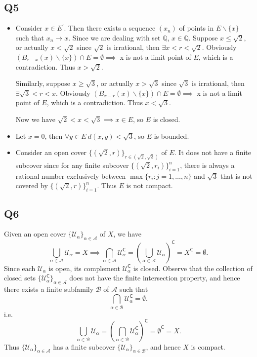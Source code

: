\documentclass[12pt,lettersize]{article}
\newcommand{\Q}{\mathbb{Q}}
\newcommand{\com}{\mathsf{C}}
\newcommand{\U}{\mathcal{U}}
\newcommand{\A}{\mathcal{A}}
\newcommand{\B}{\mathcal{B}}
\begin{document}
	\subsection*{Q5}
	\begin{itemize}
		\item Consider $x\in E^\prime$. Then there exists a sequence $(x_n)$ of points in $E\backslash\{x\}$ such that $x_n\rightarrow x$. Since we are dealing with set $\Q$, $x\in\Q$. Suppose $x\leq\sqrt{2}$, or actually $x<\sqrt{2}$ since $\sqrt{2}$ is irrational, then $\exists x<r<\sqrt{2}$. Obviously $(B_{r-x}(x)\backslash\{x\})\cap E=\emptyset\implies$ x is not a limit point of $E$, which is a contradiction. Thus $x>\sqrt{2}$.
		
		Similarly, suppose $x\geq\sqrt{3}$, or actually $x>\sqrt{3}$ since $\sqrt{3}$ is irrational, then $\exists\sqrt{3}<r<x$. Obviously $(B_{x-r}(x)\backslash\{x\})\cap E=\emptyset\implies$ x is not a limit point of $E$, which is a contradiction. Thus $x<\sqrt{3}$. 
		
		Now we have $\sqrt{2}<x<\sqrt{3}\implies x\in E$, so $E$ is closed.
		\item Let $x=0$, then $\forall y\in E\ d(x,y)<\sqrt{3}$, so $E$ is bounded.
		\item Consider an open cover $\{(\sqrt{2},r)\}_{r\in(\sqrt{2},\sqrt{3})}$ of $E$. It does not have a finite subcover since for any finite subcover $\{(\sqrt{2},r_i)\}_{i=1}^{n}$, there is always a rational number exclusively between $\max\{r_i:j=1,\dots,n\}$ and $\sqrt{3}$ that is not covered by $\{(\sqrt{2},r)\}_{i=1}^{n}$. Thus $E$ is not compact.
	\end{itemize}
	\newpage
	
	\subsection*{Q6}
	Given an open cover $\{\U_\alpha\}_{\alpha\in\A}$ of $X$, we have
	\begin{displaymath}
		\bigcup_{\alpha\in\A}\U_\alpha=X\implies \bigcap_{\alpha\in\A}\U_{\alpha}^{\com}=\left(\bigcup_{\alpha\in\A}\U_\alpha\right)^\com=X^\com=\emptyset.
	\end{displaymath}
	Since each $\U_\alpha$ is open, its complement $\U_\alpha^\com$ is closed. Observe that the collection of closed sets $\{\U_{\alpha}^{\com}\}_{\alpha\in\A}$ does not have the finite intersection property, and hence there exists a finite subfamily $\B$ of $\A$ such that 
	\begin{displaymath}
		\bigcap_{\alpha\in\B}\U_{\alpha}^{\com}=\emptyset.
	\end{displaymath}
	i.e. 
	\begin{displaymath}
		\bigcup_{\alpha\in\B}\U_{\alpha}=\left(\bigcap_{\alpha\in\B}\U_{\alpha}^{\com}\right)^\com=\emptyset^\com=X.
	\end{displaymath}
	Thus $\{\U_\alpha\}_{\alpha\in\A}$ has a finite subcover $\{\U_\alpha\}_{\alpha\in\B}$, and hence $X$ is compact.
	\newpage
	
\end{document}
